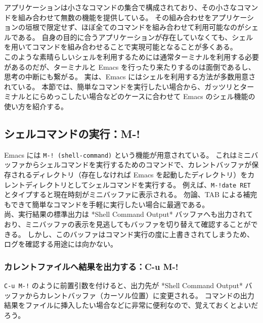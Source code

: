 アプリケーションは小さなコマンドの集合で構成されており、その小さなコマンドを組み合わせて無数の機能を提供している。
その組み合わせをアプリケーションの垣根で限定せず、ほぼ全てのコマンドを組み合わせて利用可能なのがシェルである。
自身の目的に合うアプリケーションが存在していなくても、シェルを用いてコマンドを組み合わせることで実現可能となることが多くある。\\

このような素晴らしいシェルを利用するためには通常ターミナルを利用する必要があるのだが、ターミナルと Emacs を行ったり来たりするのは面倒であるし、思考の中断にも繋がる。
実は、Emacs にはシェルを利用する方法が多数用意されている。
本節では、簡単なコマンドを実行したい場合から、ガッツリとターミナルとにらめっこしたい場合などのケースに合わせて Emacs のシェル機能の使い方を紹介する。
\subsection{シェルコマンドの実行：M-!}
Emacs には \texttt{M-! (shell-command)} という機能が用意されている。
これはミニバッファからシェルコマンドを実行するためのコマンドで、カレントバッファが保存されるディレクトリ（存在しなければ Emacs を起動したディレクトリ）をカレントディレクトリとしてシェルコマンドを実行する。
例えば、\texttt{M-!\hphantom{.}date RET} とタイプすると現在時刻がミニバッファに表示される。
勿論、TAB による補完もできて簡単なコマンドを手軽に実行したい場合に最適である。\\

尚、実行結果の標準出力は *Shell Command Output* バッファへも出力されており、ミニバッファの表示を見逃してもバッファを切り替えて確認することができる。
しかし、このバッファはコマンド実行の度に上書きされてしまうため、ログを確認する用途には向かない。
\subsubsection{カレントファイルへ結果を出力する：C-u M-!}
\texttt{C-u M-!} のように前置引数を付けると、出力先が *Shell Command Output* バッファからカレントバッファ（カーソル位置）に変更される。
コマンドの出力結果をファイルに挿入したい場合などに非常に便利なので、覚えておくとよいだろう。
